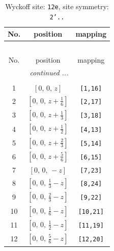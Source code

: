 \documentclass[fleqn,8pt]{jsarticle}
\begin{document}
\begin{longtable}{ccc}
\caption{Wyckoff site: {\tt 12e}, site symmetry: {\tt 2'..}}
 \\
 \hline \hline
No. & position & mapping \\ \hline \endfirsthead

\multicolumn{2}{l}{\tablename\ \thetable{}} \\
 \hline \hline
No. & position & mapping \\ \hline \endhead

 \hline \hline
\multicolumn{2}{r}{\footnotesize\it continued ...} \\ \endfoot

 \hline \hline
\multicolumn{2}{r}{} \\ \endlastfoot

1 & $\left[ 0,\, 0,\, z \right]$ & {\tt [1,16]} \\ \hline
2 & $\left[ 0,\, 0,\, z + \frac{1}{6} \right]$ & {\tt [2,17]} \\ \hline
3 & $\left[ 0,\, 0,\, z + \frac{1}{3} \right]$ & {\tt [3,18]} \\ \hline
4 & $\left[ 0,\, 0,\, z + \frac{1}{2} \right]$ & {\tt [4,13]} \\ \hline
5 & $\left[ 0,\, 0,\, z + \frac{2}{3} \right]$ & {\tt [5,14]} \\ \hline
6 & $\left[ 0,\, 0,\, z + \frac{5}{6} \right]$ & {\tt [6,15]} \\ \hline
7 & $\left[ 0,\, 0,\, - z \right]$ & {\tt [7,23]} \\ \hline
8 & $\left[ 0,\, 0,\, \frac{1}{3} - z \right]$ & {\tt [8,24]} \\ \hline
9 & $\left[ 0,\, 0,\, \frac{2}{3} - z \right]$ & {\tt [9,22]} \\ \hline
10 & $\left[ 0,\, 0,\, \frac{1}{6} - z \right]$ & {\tt [10,21]} \\ \hline
11 & $\left[ 0,\, 0,\, \frac{1}{2} - z \right]$ & {\tt [11,19]} \\ \hline
12 & $\left[ 0,\, 0,\, \frac{5}{6} - z \right]$ & {\tt [12,20]} \\
\end{longtable}
\renewcommand{\arraystretch}{1.2}
\end{document}

